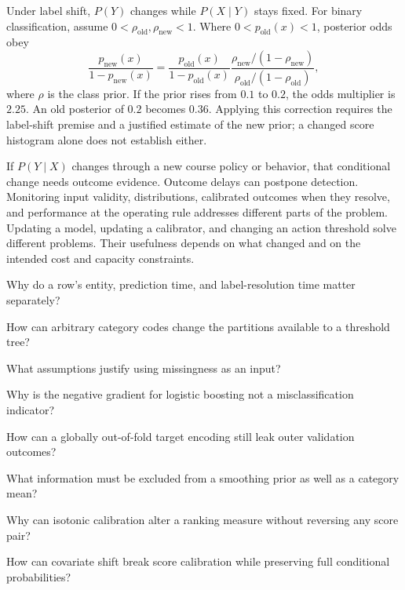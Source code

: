 Under label shift, $P(Y)$ changes while $P(X\mid Y)$ stays fixed. For binary classification, assume $0<\rho_{\mathrm{old}},\rho_{\mathrm{new}}<1$. Where $0<p_{\mathrm{old}}(x)<1$, posterior odds obey
\[
\frac{p_{\mathrm{new}}(x)}{1-p_{\mathrm{new}}(x)}
=
\frac{p_{\mathrm{old}}(x)}{1-p_{\mathrm{old}}(x)}
\frac{\rho_{\mathrm{new}}/(1-\rho_{\mathrm{new}})}
{\rho_{\mathrm{old}}/(1-\rho_{\mathrm{old}})},
\]
where $\rho$ is the class prior. If the prior rises from $0.1$ to $0.2$, the odds multiplier is $2.25$. An old posterior of $0.2$ becomes $0.36$. Applying this correction requires the label-shift premise and a justified estimate of the new prior; a changed score histogram alone does not establish either.

If $P(Y\mid X)$ changes through a new course policy or behavior, that conditional change needs outcome evidence. Outcome delays can postpone detection. Monitoring input validity, distributions, calibrated outcomes when they resolve, and performance at the operating rule addresses different parts of the problem. Updating a model, updating a calibrator, and changing an action threshold solve different problems. Their usefulness depends on what changed and on the intended cost and capacity constraints.

\begin{studyquestions}
\item Why do a row's entity, prediction time, and label-resolution time matter separately?
\item How can arbitrary category codes change the partitions available to a threshold tree?
\item What assumptions justify using missingness as an input?
\item Why is the negative gradient for logistic boosting not a misclassification indicator?
\item How can a globally out-of-fold target encoding still leak outer validation outcomes?
\item What information must be excluded from a smoothing prior as well as a category mean?
\item Why can isotonic calibration alter a ranking measure without reversing any score pair?
\item How can covariate shift break score calibration while preserving full conditional probabilities?
\end{studyquestions}

